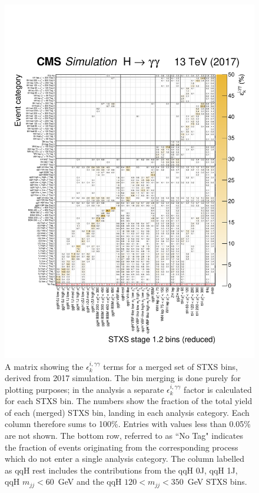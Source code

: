 \begin{figure}
  \centering
  \includegraphics[width=1\textwidth]{Figures/app_matrices/migrationMatrix_2017_thesis.pdf}
  \caption[Efficiency times acceptance matrix from 2017 simulation]
  {
    A matrix showing the $\epsilon^{i,\gamma\gamma}_{k}$ terms for a merged set of STXS bins, derived from 2017 simulation. The bin merging is done purely for plotting purposes; in the analysis a separate $\epsilon^{i,\gamma\gamma}_{k}$ factor is calculated for each STXS bin. The numbers show the fraction of the total yield of each (merged) STXS bin, landing in each analysis category. Each column therefore sums to 100\%. Entries with values less than 0.05\% are not shown. The bottom row, referred to as ``No Tag" indicates the fraction of events originating from the corresponding process which do not enter a single analysis category. The column labelled as qqH rest includes the contributions from the qqH 0J, qqH 1J, qqH $m_{jj}<60$~GeV and the qqH $120<m_{jj}<350$~GeV STXS bins.
  }
  \label{fig:ea_2017}
\end{figure}

